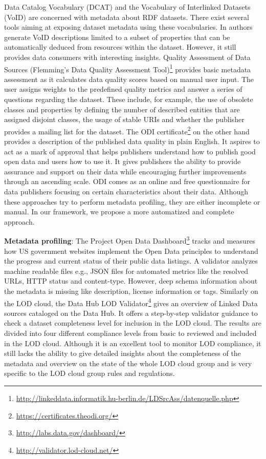 \documentclass[runningheads,a4paper]{llncs}
\begin{document}
Data Catalog Vocabulary (DCAT) \cite{Erickson:14:DCV} and the Vocabulary of Interlinked Datasets (VoID) \cite{Cyganiak:11:DLD} are concerned with metadata about RDF datasets. There exist several tools aiming at exposing dataset metadata using these vocabularies. In \cite{BoHm:2011:CVD:2030805.2031001} authors generate VoID descriptions limited to a subset of properties that can be automatically deduced from resources within the dataset. However, it still provides data consumers with interesting insights. Quality Assessment of Data Sources (Flemming's Data Quality Assessment Tool)\footnote{\url{http://linkeddata.informatik.hu-berlin.de/LDSrcAss/datenquelle.php}} provides basic metadata assessment as it calculates data quality scores based on manual user input. The user assigns weights to the predefined quality metrics and answer a series of questions regarding the dataset. These include, for example, the use of obsolete classes and properties by defining the number of described entities that are assigned disjoint classes, the usage of stable URIs and whether the publisher provides a mailing list for the dataset. The ODI certificate\footnote{\url{https://certificates.theodi.org/}} on the other hand provides a description of the published data quality in plain English. It aspires to act as a mark of approval that helps publishers understand how to publish good open data and users how to use it. It gives publishers the ability to provide assurance and support on their data while encouraging further improvements through an ascending scale. ODI comes as an online and free questionnaire for data publishers focusing on certain characteristics about their data. Although these approaches try to perform metadata profiling, they are either incomplete or manual. In our framework, we propose a more automatized and complete approach.

\textbf{Metadata profiling}: The Project Open Data Dashboard\footnote{\url{http://labs.data.gov/dashboard/}} tracks and measures how US government websites implement the Open Data principles to understand the progress and current status of their public data listings. A validator analyzes machine readable files e.g., JSON files for automated metrics like the resolved URLs, HTTP status and content-type. However, deep schema information about the metadata is missing like description, license information or tags. Similarly on the LOD cloud, the Data Hub LOD Validator\footnote{\url{http://validator.lod-cloud.net/}} gives an overview of Linked Data sources cataloged on the Data Hub. It offers a step-by-step validator guidance to check a dataset completeness level for inclusion in the LOD cloud. The results are divided into four different compliance levels from basic to reviewed and included in the LOD cloud. Although it is an excellent tool to monitor LOD compliance, it still lacks the ability to give detailed insights about the completeness of the metadata and overview on the state of the whole LOD cloud group and is very specific to the LOD cloud group rules and regulations.
\end{document}
